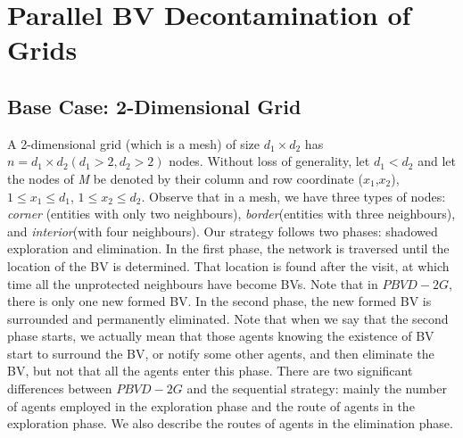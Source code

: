 \section{Parallel BV Decontamination of Grids}
\subsection{Base Case: 2-Dimensional Grid}
A 2-dimensional grid (which is a mesh) of size $d_1\times d_2$ has $n=d_1\times d_2(d_1>2,d_2>2)$ nodes. Without loss of generality, let $d_1<d_2$ and let the nodes of {\em M} be denoted by their column and row coordinate ($x_1$,$x_2$), $1\leq x_1 \leq d_1$, $1\leq x_2 \leq d_2$. Observe that in a mesh, we have three types of nodes: \textit{corner} (entities with only two neighbours), \textit{border}(entities with three neighbours), and \textit{interior}(with four neighbours).  Our strategy follows two phases: shadowed exploration and elimination. In the first phase, the network is traversed until the location of the BV is determined. That location is found after the visit, at which time    all the  unprotected neighbours have become BVs.  Note that in $PBVD-2G$, there is  only one new formed BV. In the second phase, the new formed BV is surrounded and permanently eliminated. Note that when we say that  the second phase starts, we actually mean that those agents knowing the existence of BV start to surround the BV, or notify some other agents, and then eliminate the BV, but not   that all the agents enter this phase. There are two significant differences between $PBVD-2G$ and the sequential strategy: mainly the number of agents employed in the exploration phase and  the route of agents in the exploration phase. We also describe the routes of agents in the elimination phase. \ \\

 \\

